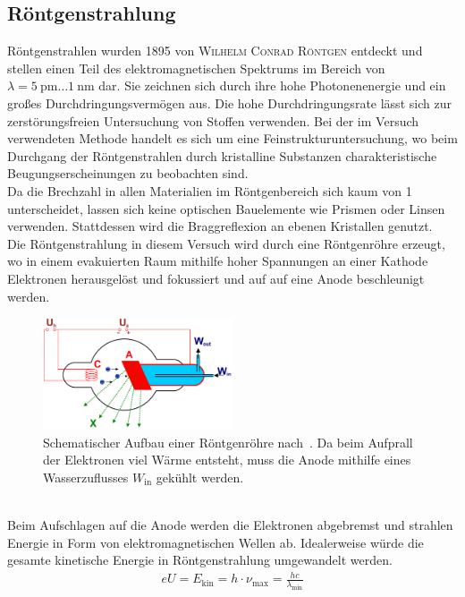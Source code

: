 \documentclass[a4paper,twoside,final]{article}
\begin{document}
\subsection{Röntgenstrahlung}
Röntgenstrahlen wurden 1895 von \textsc{Wilhelm Conrad Röntgen} entdeckt und stellen einen Teil des elektromagnetischen Spektrums im Bereich von $\lambda = \SI{5}{\pico \metre}\hdots \SI{1}{\nano\metre}$ dar. Sie zeichnen sich durch ihre hohe Photonenenergie und ein großes Durchdringungsvermögen aus. Die hohe Durchdringungsrate lässt sich zur zerstörungsfreien Untersuchung von Stoffen verwenden. Bei der im Versuch verwendeten Methode handelt es sich um eine Feinstrukturuntersuchung, wo beim Durchgang der Röntgenstrahlen durch kristalline Substanzen charakteristische Beugungserscheinungen zu beobachten sind.\\
Da die Brechzahl in allen Materialien im Röntgenbereich sich kaum von 1 unterscheidet, lassen sich keine optischen Bauelemente wie Prismen oder Linsen verwenden. Stattdessen wird die Braggreflexion an ebenen Kristallen genutzt.\\
Die Röntgenstrahlung in diesem Versuch wird durch eine Röntgenröhre erzeugt, wo in einem evakuierten Raum mithilfe hoher Spannungen an einer Kathode Elektronen herausgelöst und fokussiert und auf auf eine Anode beschleunigt werden.
\begin{figure}[htp]
    \centering
    \includegraphics[width=0.5\textwidth]{Abbildungen/WaterCooledXrayTube.pdf}
    \caption{Schematischer Aufbau einer Röntgenröhre nach~\cite{Roentgenroehre}. Da beim Aufprall der Elektronen viel Wärme entsteht, muss die Anode mithilfe eines Wasserzuflusses $W_\text{in}$ gekühlt werden.}
    \label{fig:Roentgenroehre}
\end{figure}\\
Beim Aufschlagen auf die Anode werden die Elektronen abgebremst und strahlen Energie in Form von elektromagnetischen Wellen ab. Idealerweise würde die gesamte kinetische Energie in Röntgenstrahlung umgewandelt werden.
\begin{align}
  e U = E_\text{kin} = h \cdot \nu_\text{max} = \frac{hc}{\lambda_\text{min}}
\end{align}
\end{document}

